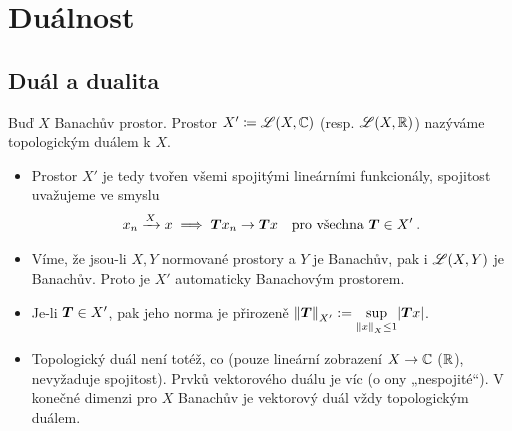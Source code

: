 %





\section{Duálnost}

\subsection{Duál a dualita}

\begin{definition}[Duál]
Buď $X$ Banachův prostor. Prostor $X' \coloneqq \mathscr{L}(X,\mathbb{C})$ \hspace{0.5em} (resp. $\mathscr{L}(X, \mathbb{R})$) nazýváme topologickým duálem k $X$.
\end{definition}

\begin{remark} 
\begin{itemize}
    \item Prostor $X'$ je tedy tvořen všemi spojitými lineárními funkcionály, spojitost uvažujeme ve smyslu \begin{align*}
        x_n \xrightarrow{X} x \implies \boldsymbol{T} x_n \to \boldsymbol{T} x \quad \text{pro všechna } \boldsymbol{T} \in X' \:.
    \end{align*}
    \item Víme, že jsou-li $X,Y$ normované prostory a $Y$ je Banachův, pak i $\mathscr{L} (X,Y)$ je Banachův. Proto je $X'$ automaticky Banachovým prostorem.
    \item Je-li $\boldsymbol{T} \in X'$, pak jeho norma je přirozeně $\left\lVert\boldsymbol{T}\right\rVert_{X'} := \underset{\left\lVert x\right\rVert_X \leq 1}{\sup} |\boldsymbol{T}x|$.
    \item Topologický duál není totéž, co  (pouze lineární zobrazení $X \to \mathbb{C}$ ($\mathbb{R}$), nevyžaduje spojitost). Prvků vektorového duálu je víc (o ony „nespojité“). V konečné dimenzi pro $X$ Banachův je vektorový duál vždy topologickým duálem.
\end{itemize}
\end{remark}


